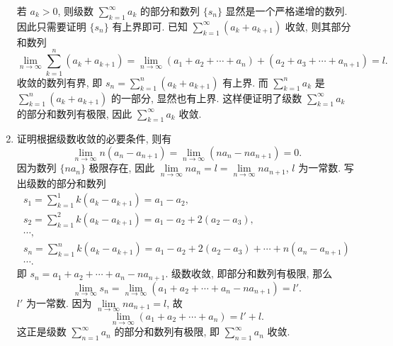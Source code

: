 \begin{enumerate}
        若 $a_k > 0$, 则级数 $\sum\limits_{k=1}^\infty a_k$ 的部分和数列 $\{s_n\}$ 显然是一个严格递增的数列.
        因此只需要证明 $\{s_n\}$ 有上界即可. 已知 $\sum\limits_{k=1}^\infty (a_k + a_{k+1})$ 收敛, 则其部分和数列
        \[
            \lim_{n\to\infty}\sum_{k=1}^n (a_k + a_{k+1}) = \lim_{n\to\infty} (a_1 + a_2 + \cdots + a_n) + (a_2 + a_3 + \cdots + a_{n+1}) = l.    
        \]
        收敛的数列有界, 即 $s_n = \sum\limits_{k=1}^n (a_k + a_{k+1})$ 有上界.
        而 $\sum\limits_{k=1}^n a_k$ 是 $\sum\limits_{k=1}^n (a_k + a_{k+1})$ 的一部分, 显然也有上界.
        这样便证明了级数 $\sum\limits_{k=1}^\infty a_k$ 的部分和数列有极限, 因此 $\sum\limits_{k=1}^\infty a_k$ 收敛.
    \item %
        {\heiti 证明}\quad 根据级数收敛的必要条件, 则有
        \[
            \lim_{n\to\infty}n(a_n - a_{n+1}) = \lim_{n\to\infty}(na_n - na_{n+1}) = 0.
        \]
        因为数列 $\{na_n\}$ 极限存在, 因此 $\lim\limits_{n\to\infty}na_n = l = \lim\limits_{n\to\infty}na_{n+1}$, $l$ 为一常数.
        写出级数的部分和数列
        \begin{gather*}
            s_1 = \sum_{k=1}^1 k(a_k - a_{k+1}) = a_1 - a_2, \\
            s_2 = \sum_{k=1}^2 k(a_k - a_{k+1}) = a_1 - a_2 + 2(a_2 - a_3), \\
            \cdots, \\
            s_n = \sum_{k=1}^n k(a_k - a_{k+1}) = a_1 - a_2 + 2(a_2 - a_3) + \cdots + n(a_n - a_{n+1}) \\
            \cdots.
        \end{gather*}
        即 $s_n = a_1 + a_2 + \cdots + a_n - na_{n+1}$. 级数收敛, 即部分和数列有极限, 那么
        \[
            \lim_{n\to\infty}s_n = \lim_{n\to\infty} (a_1 + a_2 + \cdots + a_n - na_{n+1}) = l'.    
        \]
        $l'$ 为一常数. 因为 $\lim\limits_{n\to\infty}na_{n+1} = l$, 故
        \[
            \lim_{n\to\infty} (a_1 + a_2 + \cdots + a_n) = l' + l.    
        \]
        这正是级数 $\sum\limits_{n=1}^\infty a_n$ 的部分和数列有极限, 即 $\sum\limits_{n=1}^\infty a_n$ 收敛.
\end{enumerate}
% 
